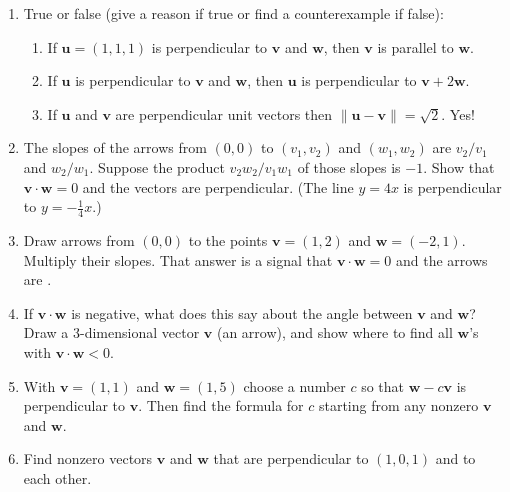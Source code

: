 \documentclass[14pt, a4paper]{article}
\begin{document}
\begin{enumerate}
    \item True or false (give a reason if true or find a counterexample if false):
          \begin{enumerate}
              \item If $\boldsymbol{u} = (1,1,1)$ is perpendicular to $\boldsymbol{v}$ and $\boldsymbol{w}$, then $\boldsymbol{v}$ is parallel to $\boldsymbol{w}$.
              \item If $\boldsymbol{u}$ is perpendicular to $\boldsymbol{v}$ and $\boldsymbol{w}$, then $\boldsymbol{u}$ is perpendicular to $\boldsymbol{v} + 2\boldsymbol{w}$.
              \item If $\boldsymbol{u}$ and $\boldsymbol{v}$ are perpendicular unit vectors then $\|\boldsymbol{u} - \boldsymbol{v}\| = \sqrt{2}$. Yes!
          \end{enumerate}

    \item The slopes of the arrows from $(0,0)$ to $(v_1,v_2)$ and $(w_1,w_2)$ are $v_2/v_1$ and $w_2/w_1$. Suppose the product $v_2 w_2 / v_1 w_1$ of those slopes is $-1$. Show that $\boldsymbol{v} \cdot \boldsymbol{w} = 0$ and the vectors are perpendicular. (The line $y = 4x$ is perpendicular to $y = -\frac{1}{4}x$.)

    \item Draw arrows from $(0,0)$ to the points $\boldsymbol{v} = (1,2)$ and $\boldsymbol{w} = (-2,1)$. Multiply their slopes. That answer is a signal that $\boldsymbol{v} \cdot \boldsymbol{w} = 0$ and the arrows are \underline{\hspace{2cm}}.

    \item If $\boldsymbol{v} \cdot \boldsymbol{w}$ is negative, what does this say about the angle between $\boldsymbol{v}$ and $\boldsymbol{w}$? Draw a 3-dimensional vector $\boldsymbol{v}$ (an arrow), and show where to find all $\boldsymbol{w}$'s with $\boldsymbol{v} \cdot \boldsymbol{w} < 0$.

    \item With $\boldsymbol{v} = (1,1)$ and $\boldsymbol{w} = (1,5)$ choose a number $c$ so that $\boldsymbol{w} - c\boldsymbol{v}$ is perpendicular to $\boldsymbol{v}$. Then find the formula for $c$ starting from any nonzero $\boldsymbol{v}$ and $\boldsymbol{w}$.

    \item Find nonzero vectors $\boldsymbol{v}$ and $\boldsymbol{w}$ that are perpendicular to $(1,0,1)$ and to each other.


\end{enumerate}
\end{document}
